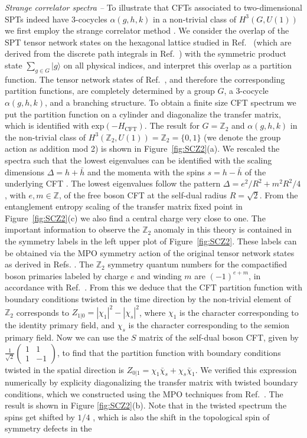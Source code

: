 \documentclass[aps,pra,twocolumn,superscriptaddress,10pt,article,nofootinbib,showpacs]{revtex4-1}
\begin{document}
\emph{Strange correlator spectra --} To illustrate that CFTs associated to two-dimensional SPTs indeed have 3-cocycles $\alpha(g,h,k)$ in a non-trivial class of $H^3(G,U(1))$ we first employ the strange correlator method \cite{YouBi}. We consider the overlap of the SPT tensor network states on the hexagonal lattice studied in Ref.~\cite{SPTpaper} (which are derived from the discrete path integrals in Ref.~\cite{ChenGu}) with the symmetric product state $\sum_{g\in G} |g\rangle$ on all physical indices, and interpret this overlap as a partition function. The tensor network states of Ref.~\cite{SPTpaper}, and therefore the corresponding partition functions, are completely determined by a group $G$, a 3-cocycle $\alpha(g,h,k)$, and a branching structure. To obtain a finite size CFT spectrum we put the partition function on a cylinder and diagonalize the transfer matrix, which is identified with $\text{exp}(-H_{\text{CFT}})$. The result for $G=\mathbb{Z}_2$ and $\alpha(g,h,k)$ in the non-trivial class of $H^3(\mathbb{Z}_2,U(1))=\mathbb{Z}_2=\{0,1\}$ (we denote the group action as addition mod 2) is shown in Figure~\ref{fig:SCZ2}(a). We rescaled the spectra such that the lowest eigenvalues can be identified with the scaling dimensions $\Delta=h+\bar{h}$ and the momenta with the spins $s=h-\bar{h}$ of the underlying CFT \cite{Affleck,BloteCardy}. The lowest eigenvalues follow the pattern $\Delta=e^2/R^2+m^2R^2/4$, with $e,m\in\mathbb{Z}$, of the free boson CFT at the self-dual radius $R=\sqrt{2}$. From the entanglement entropy scaling of the transfer matrix fixed point\cite{CalabreseCardy} in Figure~\ref{fig:SCZ2}(c) we also find a central charge very close to one. The important information to observe the $\mathbb{Z}_2$ anomaly in this theory is contained in the symmetry labels in the left upper plot of Figure~\ref{fig:SCZ2}. These labels can be obtained via the MPO symmetry action of the original tensor network states as derived in Refs. \cite{ChenLiu,SPTpaper}. The $\mathbb{Z}_2$ symmetry quantum numbers for the compactified boson primaries labeled by charge $e$ and winding $m$ are $(-1)^{e+m}$, in accordance with Ref.~\cite{ChenWen}. From this we deduce that the CFT partition function with boundary conditions twisted in the time direction by the non-trivial element of $\mathbb{Z}_2$ corresponds to $Z_{1|0}=|\chi_1|^2-|\chi_s|^2$, where $\chi_1$ is the character corresponding to the identity primary field, and $\chi_s$ is the character corresponding to the semion primary field. Now we can use the $S$ matrix of the self-dual boson CFT, given by $\frac{1}{\sqrt{2}}\left(\begin{matrix}1&1\\1&-1\end{matrix}\right)$, to find that the partition function with boundary conditions twisted in the spatial direction is $Z_{0|1}=\chi_1\bar{\chi}_s + \chi_s\bar{\chi}_1$. We verified this expression numerically by explicity diagonalizing the transfer matrix with twisted boundary conditions, which we constructed using the MPO techniques from Ref.~\cite{SPTpaper}. The result is shown in Figure \ref{fig:SCZ2}(b). Note that in the twisted spectrum the spins get shifted by $1/4$ \cite{SantosWang}, which is also the shift in the topological spin of symmetry defects in the 
\end{document}
